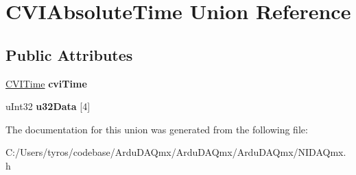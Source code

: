 \hypertarget{union_c_v_i_absolute_time}{}\section{C\+V\+I\+Absolute\+Time Union Reference}
\label{union_c_v_i_absolute_time}
\subsection*{Public Attributes}
\begin{DoxyCompactItemize}
\item 
\mbox{\label{union_c_v_i_absolute_time_a3535a0244237868ae016425882945eeb}} 
\mbox{\hyperlink{struct_c_v_i_time}{C\+V\+I\+Time}} {\bfseries cvi\+Time}
\item 
\mbox{\label{union_c_v_i_absolute_time_a0a5d49287f00ef8a51e22c3a00b1b008}} 
u\+Int32 {\bfseries u32\+Data} \mbox{[}4\mbox{]}
\end{DoxyCompactItemize}


The documentation for this union was generated from the following file\+:\begin{DoxyCompactItemize}
\item 
C\+:/\+Users/tyros/codebase/\+Ardu\+D\+A\+Qmx/\+Ardu\+D\+A\+Qmx/\+Ardu\+D\+A\+Qmx/N\+I\+D\+A\+Qmx.\+h\end{DoxyCompactItemize}
